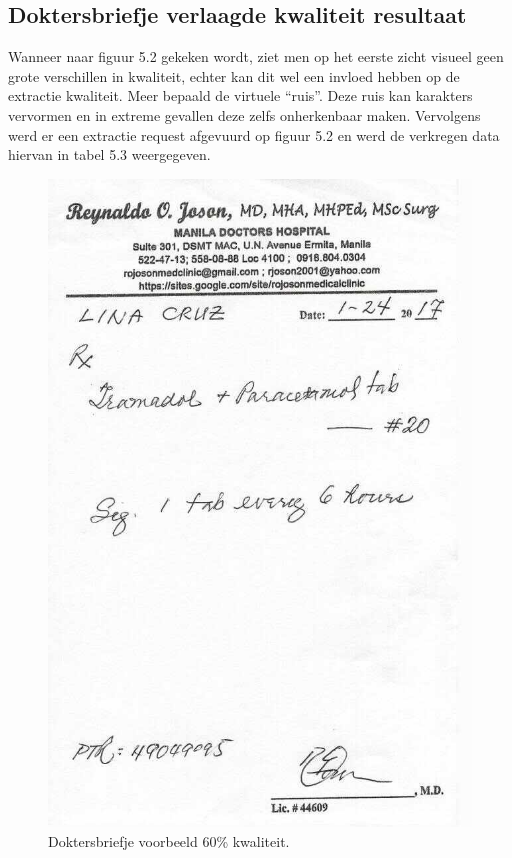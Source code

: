 \subsection{Doktersbriefje verlaagde kwaliteit resultaat}
Wanneer naar figuur 5.2 gekeken wordt, ziet men op het eerste zicht visueel geen grote verschillen in kwaliteit, echter kan dit wel een invloed hebben op de extractie kwaliteit. Meer bepaald de virtuele “ruis”. Deze ruis kan karakters vervormen en in extreme gevallen deze zelfs onherkenbaar maken. Vervolgens werd er een extractie request afgevuurd op figuur 5.2 en werd de verkregen data hiervan in tabel 5.3 weergegeven.
\begin{figure}[h]
	
	\includegraphics[width=\textwidth,height=\textheight,keepaspectratio]{../doktersbriefjes/61procent}	
	\captionsetup{justification=centering,margin=2cm}
	\caption{Doktersbriefje voorbeeld 60\% kwaliteit. \cite{}}
	\centering
\end{figure} 

